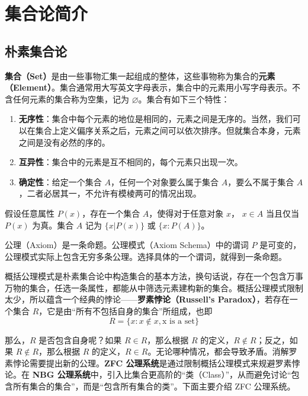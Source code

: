 \chapter{集合论简介}
\section{朴素集合论}
\textbf{集合（Set）}是由一些事物汇集一起组成的整体，这些事物称为集合的\textbf{元素（Element）}。集合通常用大写英文字母表示，集合中的元素用小写字母表示。不含任何元素的集合称为空集，记为 $\varnothing$。集合有如下三个特性：
\begin{enumerate}
\item \textbf{无序性}：集合中每个元素的地位是相同的，元素之间是无序的。当然，我们可以在集合上定义偏序关系之后，元素之间可以依次排序。但就集合本身，元素之间是没有必然的序的。 
\item \textbf{互异性}：集合中的元素是互不相同的，每个元素只出现一次。
\item \textbf{确定性}：给定一个集合 $A$，任何一个对象要么属于集合 $A$，要么不属于集合 $A$，二者必居其一，不允许有模棱两可的情况出现。
\end{enumerate}

\begin{axiom}
    假设任意属性 $P(x)$，存在一个集合 $A$，使得对于任意对象 $x$， $x\in A$ 当且仅当 $P(x)$ 为真。集合 $A$ 记为 $\{x|P(x)\}$ 或 $\{x:P(A)\}$。
\end{axiom}

\begin{note}
    公理（Axiom）是一条命题。公理模式（Axiom Schema）中的谓词 $P$ 是可变的，公理模式实际上包含无穷多条公理。选择具体的一个谓词，就得到一条命题。
\end{note}
\vspace{1em}

概括公理模式是朴素集合论中构造集合的基本方法，换句话说，存在一个包含万事万物的集合，任选一条属性，都能从中筛选元素建构新的集合。概括公理模式限制太少，所以蕴含一个经典的悖论——\textbf{罗素悖论（Russell's Paradox）}，若存在一个集合 $R$，它是由“所有不包括自身的集合”所组成，也即
    \[
        R = \{x:x\notin x, \text{x is a set}\}
    \]

那么，$R$ 是否包含自身呢？如果 $R\in R$，那么根据 $R$ 的定义，$R\notin R$；反之，如果 $R\notin R$，那么根据 $R$ 的定义，$R\in R$。无论哪种情况，都会导致矛盾。消解罗素悖论需要提出新的公理。\textbf{ZFC 公理系统}是通过限制概括公理模式来规避罗素悖论。在 \textbf{NBG 公理系统}中，引入比集合更高阶的“类（Class）”，从而避免讨论“包含所有集合的集合”，而是“包含所有集合的类”。下面主要介绍 ZFC 公理系统。
\newpage